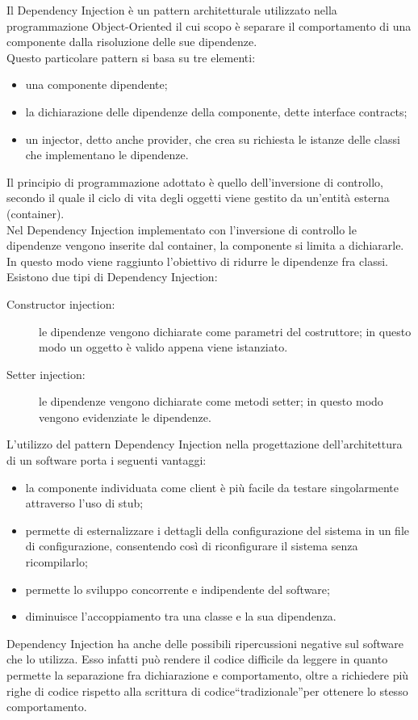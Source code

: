 	 \label{app:dependencyinjection}
Il Dependency Injection è un pattern architetturale utilizzato nella programmazione Object-Oriented il cui scopo è separare il comportamento di una componente dalla risoluzione delle sue dipendenze. \\
Questo particolare pattern si basa su tre elementi:
\begin{itemize}
\item una componente dipendente;
\item la dichiarazione delle dipendenze della componente, dette interface contracts;
\item un injector, detto anche provider, che crea su richiesta le istanze delle classi che implementano le dipendenze.
\end{itemize}
Il principio di programmazione adottato è quello dell'inversione di controllo, secondo il quale il ciclo di vita degli oggetti viene gestito da un'entità esterna (container).\\
Nel Dependency Injection implementato con l'inversione di controllo le dipendenze vengono inserite dal container, la componente si limita a dichiararle. In questo modo viene raggiunto l'obiettivo di ridurre le dipendenze fra classi.\\
Esistono due tipi di Dependency Injection:
\begin{description}
	\item[Constructor injection:] le dipendenze vengono dichiarate come parametri del costruttore; in questo modo un oggetto è valido appena viene istanziato.
	\item[Setter injection:] le dipendenze vengono dichiarate come metodi setter; in questo modo vengono evidenziate le dipendenze.
\end{description}

L'utilizzo del pattern Dependency Injection nella progettazione dell'architettura di un software porta i seguenti vantaggi:
\begin{itemize}
\item la componente individuata come client è più facile da testare singolarmente attraverso l'uso di stub;
\item permette di esternalizzare i dettagli della configurazione del sistema in un file di configurazione, consentendo così di riconfigurare il sistema senza ricompilarlo;
\item permette lo sviluppo concorrente e indipendente del software;
\item diminuisce l'accoppiamento tra una classe e la sua dipendenza.
\end{itemize}
Dependency Injection ha anche delle possibili ripercussioni negative sul software che lo utilizza. Esso infatti può rendere il codice difficile da leggere in quanto permette la separazione fra dichiarazione e comportamento, oltre a richiedere più righe di codice rispetto alla scrittura di codice“tradizionale”per ottenere lo stesso comportamento.


